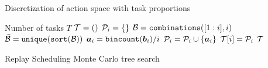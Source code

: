 \begin{algorithm}[h!]
	\small
	\caption{Discretization of action space with task proportions}
	\label{paperC:alg:action_space_discretization}
	\begin{algorithmic}[1]
		\Require Number of tasks $T$
		\State ${\mathcal{T}} = ()$ 
		\State ${\mathcal{P}}_i = \{\}$ 
		\State ${\mathcal{B}} = \texttt{combinations}([1:i], i)$ 
		\State $\bar{{\mathcal{B}}} = \texttt{unique}(\texttt{sort}({\mathcal{B}}))$ 
		\State ${\bm{a}}_i = \texttt{bincount}({\bm{b}}_i) / i$ 
		\State ${\mathcal{P}}_i = {\mathcal{P}}_i \cup \{ {\bm{a}}_i \}$ 
		\EndFor
		\State ${\mathcal{T}}[i] = {\mathcal{P}}_i$ 
		\EndFor
		\State \Return ${\mathcal{T}}$ 
	\end{algorithmic}
\end{algorithm}

\begin{algorithm}[h!]
	\caption{Replay Scheduling Monte Carlo tree search}
	\label{alg:replay_scheduling_mcts}
	\algrenewcommand{}
	\scriptsize
	
\end{algorithm}










